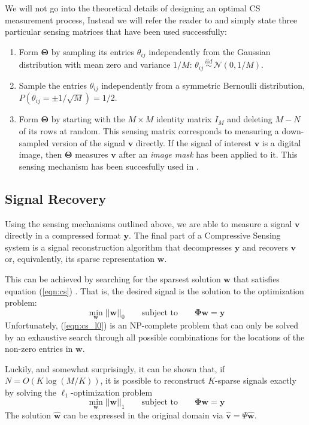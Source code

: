 We will not go into the theoretical details of designing an optimal CS measurement process, Instead we will refer the reader to \cite{candes2008} and simply state three particular sensing matrices that have been used successfully:
\begin{enumerate}
\item Form $\bm\Theta$ by sampling its entries $\theta_{ij}$ independently from the Gaussian distribution with mean zero and variance $1/M$: $\theta_{ij}\, \stackrel{iid}{\sim}\, \mathcal{N}(0,1/M)$.
\item Sample the entries $\theta_{ij}$ independently from a symmetric Bernoulli distribution, $P(\theta_{ij} = \pm 1/\sqrt{M}) = 1/2$. 
\item Form $\bm\Theta$ by starting with the $M\times M$ identity matrix $I_M$ and deleting $M-N$ of its rows at random. This sensing matrix corresponds to measuring a down-sampled version of the signal $\bm v$ directly. If the signal of interest $\bm v$ is a digital image, then $\bm\Theta$ measures $\bm v$ after an \emph{image mask} has been applied to it. This sensing mechanism has been succesfully used in \cite{pilikos2014}.
\end{enumerate}

\subsection{Signal Recovery}
Using the sensing mechanisms outlined above, we are able to measure a signal $\bm v$ directly in a compressed format $\bm y$.
The final part of a Compressive Sensing system is a signal reconstruction algorithm that decompresses $\bm y$ and recovers $\bm v$ or, equivalently, its sparse representation $\bm w$.

This can be achieved by searching for the sparsest solution $\bm w$ that satisfies equation (\ref{eqn:cs}) \cite{baraniuk2007}.
That is, the desired signal is the solution to the optimization problem:
\begin{equation}
\label{eqn:cs_l0}
  \min_{\bm w} ||\bm w||_0 \qquad \mbox{subject to} \qquad \bm\Phi\bm w = \bm y
\end{equation}
Unfortunately, (\ref{eqn:cs_l0}) is an NP-complete problem that can only be solved by an exhaustive search through all possible combinations for the locations of the non-zero entries in $\bm w$.

Luckily, and somewhat surprisingly, it can be shown that, if $N = O(K\log(M/K))$, it is possible to reconstruct $K$-sparse signals exactly by solving the $\ell_1$-optimization problem \cite{baraniuk2007,candes2008}
\begin{equation}
\label{eqn:cs_l1}
  \min_{\bm w} ||\bm w||_1 \qquad \mbox{subject to} \qquad \bm\Phi\bm w = \bm y
\end{equation}
The solution $\bm{\hat w}$ can be expressed in the original domain via $\bm{\hat v} = \Psi\bm{\hat w}$.

